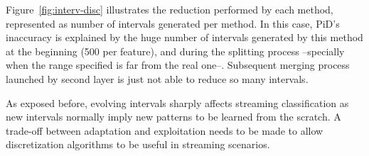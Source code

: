 \documentclass[preprint,12pt]{elsarticle}
\begin{document}
Figure~\ref{fig:interv-disc} illustrates the reduction performed by each method, represented as number of intervals generated per method. In this case, PiD's inaccuracy is explained by the huge number of intervals generated by this method at the beginning (500 per feature), and during the splitting process --specially when the range specified is far from the real one--. Subsequent merging process launched by second layer is just not able to reduce so many intervals.

As exposed before, evolving intervals sharply affects streaming classification as new intervals normally imply new patterns to be learned from the scratch. A trade-off between adaptation and exploitation needs to be made to allow discretization algorithms to be useful in streaming scenarios.


\end{document}
